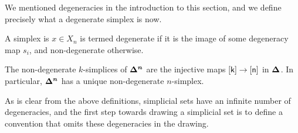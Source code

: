 \documentclass[10pt]{art}
\begin{document}
We mentioned degeneracies in the introduction to this section, and we define precisely what a degenerate simplex is now.

\begin{definition}
  A simplex is $x \in X_n$ is termed degenerate if it is the image of some degeneracy map $s_i$, and non-degenerate otherwise.
\end{definition}

\begin{example}
  The non-degenerate $k$-simplices of $\boldsymbol{\Delta^{n}}$ are the injective maps $\mathsf{[k]} \rightarrow \mathsf{[n]}$ in $\boldsymbol{\Delta^{}}$. In particular, $\boldsymbol{\Delta^{n}}$ has a unique non-degenerate $n$-simplex.
\end{example}

As is clear from the above definitions, simplicial sets have an infinite number of degeneracies, and the first step towards drawing a simplicial set is to define a convention that omits these degeneracies in the drawing.
\end{document}
